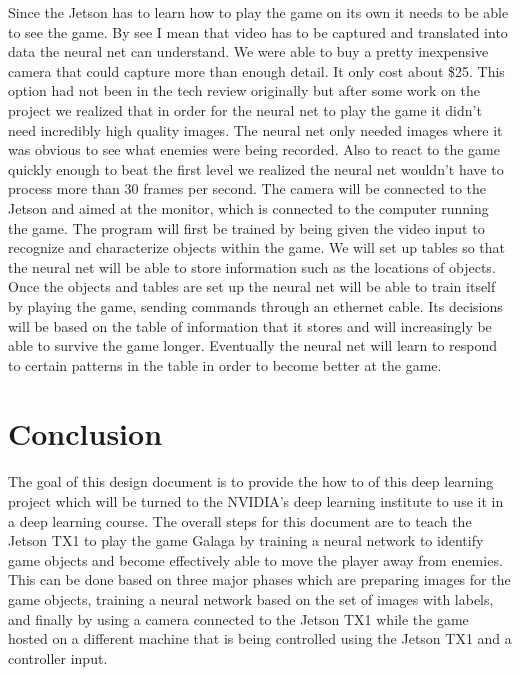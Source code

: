\documentclass[onecolumn, draftclsnofoot,10pt, compsoc]{IEEEtran}
\begin{document}
Since the Jetson has to learn how to play the game on its own it needs to be able to see the game.
By see I mean that video has to be captured and translated into data the neural net can understand.
We were able to buy a pretty inexpensive camera that could capture more than enough detail.
It only cost about \$25.
This option had not been in the tech review originally but after some work on the project we realized that in order for the neural net to play the game it didn't need incredibly high quality images.
The neural net only needed images where it was obvious to see what enemies were being recorded.
Also to react to the game quickly enough to beat the first level we realized the neural net wouldn't have to process more than 30 frames per second.
The camera will be connected to the Jetson and aimed at the monitor, which is connected to the computer running the game.
The program will first be trained by being given the video input to recognize and characterize objects within the game.
We will set up tables so that the neural net will be able to store information such as the locations of objects.
Once the objects and tables are set up the neural net will be able to train itself by playing the game, sending commands through an ethernet cable.
Its decisions will be based on the table of information that it stores and will increasingly be able to survive the game longer.
Eventually the neural net will learn to respond to certain patterns in the table in order to become better at the game.

\section{Conclusion}
The goal of this design document is to provide the how to of this deep learning project which will be turned to the NVIDIA's deep learning institute to use it in a deep learning course.
The overall steps for this document are to teach the Jetson TX1 to play the game Galaga by training a neural network to identify game objects and become effectively able to move the player away from enemies.
This can be done based on three major phases which are preparing images for the game objects, training a neural network based on the set of images with labels, and finally by using a camera connected to the Jetson TX1 while the game hosted on a different machine that is being controlled using the Jetson TX1 and a controller input.
\end{document}
